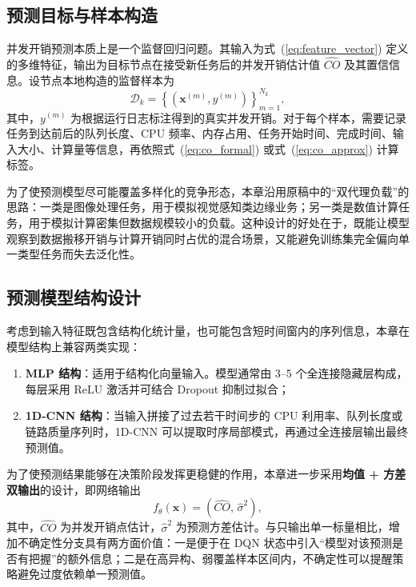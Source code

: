 \subsection{预测目标与样本构造}

并发开销预测本质上是一个监督回归问题。其输入为式~(\ref{eq:feature_vector}) 定义的多维特征，输出为目标节点在接受新任务后的并发开销估计值 $\widehat{CO}$ 及其置信信息。设节点本地构造的监督样本为
\begin{equation}
\mathcal{D}_k = \left\{ \left(\bm{x}^{(m)}, y^{(m)} \right) \right\}_{m=1}^{N_k},
\end{equation}
其中，$y^{(m)}$ 为根据运行日志标注得到的真实并发开销。对于每个样本，需要记录任务到达前后的队列长度、CPU 频率、内存占用、任务开始时间、完成时间、输入大小、计算量等信息，再依照式~(\ref{eq:co_formal}) 或式~(\ref{eq:co_approx}) 计算标签。

为了使预测模型尽可能覆盖多样化的竞争形态，本章沿用原稿中的“双代理负载”的思路：一类是图像处理任务，用于模拟视觉感知类边缘业务；另一类是数值计算任务，用于模拟计算密集但数据规模较小的负载。这种设计的好处在于，既能让模型观察到数据搬移开销与计算开销同时占优的混合场景，又能避免训练集完全偏向单一类型任务而失去泛化性。

\subsection{预测模型结构设计}

考虑到输入特征既包含结构化统计量，也可能包含短时间窗内的序列信息，本章在模型结构上兼容两类实现：

\begin{enumerate}[label=\arabic*)]
    \item \textbf{MLP 结构}：适用于结构化向量输入。模型通常由 3--5 个全连接隐藏层构成，每层采用 ReLU 激活并可结合 Dropout 抑制过拟合；
    \item \textbf{1D-CNN 结构}：当输入拼接了过去若干时间步的 CPU 利用率、队列长度或链路质量序列时，1D-CNN 可以提取时序局部模式，再通过全连接层输出最终预测值。
\end{enumerate}

为了使预测结果能够在决策阶段发挥更稳健的作用，本章进一步采用\textbf{均值 + 方差双输出}的设计，即网络输出
\begin{equation}
f_{\theta}(\bm{x}) = \left(\widehat{CO},\, \widehat{\sigma}^2 \right),
\end{equation}
其中，$\widehat{CO}$ 为并发开销点估计，$\widehat{\sigma}^2$ 为预测方差估计。与只输出单一标量相比，增加不确定性分支具有两方面价值：一是便于在 DQN 状态中引入“模型对该预测是否有把握”的额外信息；二是在高异构、弱覆盖样本区间内，不确定性可以提醒策略避免过度依赖单一预测值。

